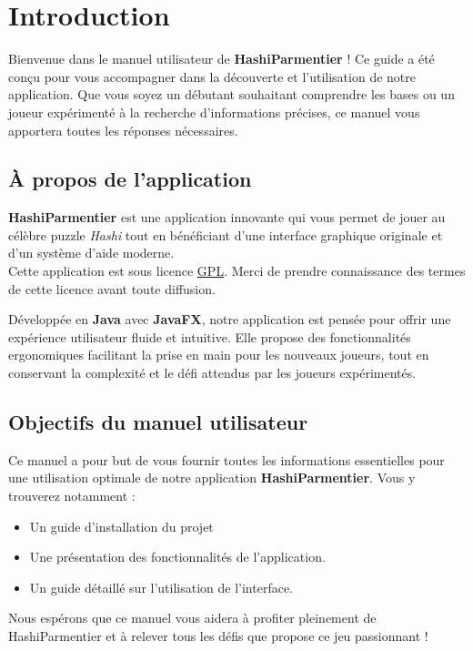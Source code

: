 \section{Introduction}

Bienvenue dans le manuel utilisateur de \textbf{HashiParmentier} ! Ce guide a été conçu pour vous accompagner dans la découverte et l'utilisation de notre application. Que vous soyez un débutant souhaitant comprendre les bases ou un joueur expérimenté à la recherche d'informations précises, ce manuel vous apportera toutes les réponses nécessaires.

\subsection{À propos de l'application}

\textbf{HashiParmentier} est une application innovante qui vous permet de jouer au célèbre puzzle \textit{Hashi} tout en bénéficiant d'une interface graphique originale et d'un système d'aide moderne.\\
Cette application est sous licence \href{https://fr.wikipedia.org/wiki/Licence_publique_g%C3%A9n%C3%A9rale_GNU}{GPL}. Merci de prendre connaissance des termes de cette licence avant toute diffusion.

Développée en \textbf{Java} avec \textbf{JavaFX}, notre application est pensée pour offrir une expérience utilisateur fluide et intuitive. Elle propose des fonctionnalités ergonomiques facilitant la prise en main pour les nouveaux joueurs, tout en conservant la complexité et le défi attendus par les joueurs expérimentés.

\subsection{Objectifs du manuel utilisateur}

Ce manuel a pour but de vous fournir toutes les informations essentielles pour une utilisation optimale de notre application \textbf{HashiParmentier}. Vous y trouverez notamment :

\begin{itemize}
    \item Un guide d'installation du projet
    \item Une présentation des fonctionnalités de l'application.
    \item Un guide détaillé sur l'utilisation de l'interface.
\end{itemize}

Nous espérons que ce manuel vous aidera à profiter pleinement de HashiParmentier et à relever tous les défis que propose ce jeu passionnant ! 

